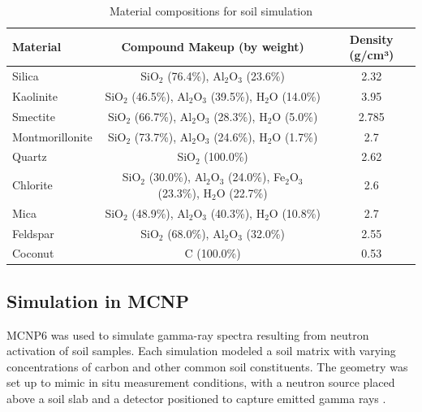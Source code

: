 \documentclass[review]{elsarticle}
\begin{document}
\begin{table}[H]
\centering
\caption{Material compositions for soil simulation}
\label{tab:materials}
\begin{tabular}{lcc}
\toprule
Material & Compound Makeup (by weight) & Density (g/cm³) \\
\midrule
Silica & SiO$_2$ (76.4\%), Al$_2$O$_3$ (23.6\%) & 2.32 \\
Kaolinite & SiO$_2$ (46.5\%), Al$_2$O$_3$ (39.5\%), H$_2$O (14.0\%) & 3.95 \\
Smectite & SiO$_2$ (66.7\%), Al$_2$O$_3$ (28.3\%), H$_2$O (5.0\%) & 2.785 \\
Montmorillonite & SiO$_2$ (73.7\%), Al$_2$O$_3$ (24.6\%), H$_2$O (1.7\%) & 2.7 \\
Quartz & SiO$_2$ (100.0\%) & 2.62 \\
Chlorite & SiO$_2$ (30.0\%), Al$_2$O$_3$ (24.0\%), Fe$_2$O$_3$ (23.3\%), H$_2$O (22.7\%) & 2.6 \\
Mica & SiO$_2$ (48.9\%), Al$_2$O$_3$ (40.3\%), H$_2$O (10.8\%) & 2.7 \\
Feldspar & SiO$_2$ (68.0\%), Al$_2$O$_3$ (32.0\%) & 2.55 \\
Coconut & C (100.0\%) & 0.53 \\
\bottomrule
\end{tabular}
\end{table}

\subsection{Simulation in MCNP}

MCNP6 \cite{werner_mcnp_2017} was used to simulate gamma-ray spectra resulting from neutron activation of soil samples. Each simulation modeled a soil matrix with varying concentrations of carbon and other common soil constituents. The geometry was set up to mimic in situ measurement conditions, with a neutron source placed above a soil slab and a detector positioned to capture emitted gamma rays \cite{kavetskiy_neutron-stimulated_2017}.
\end{document}

